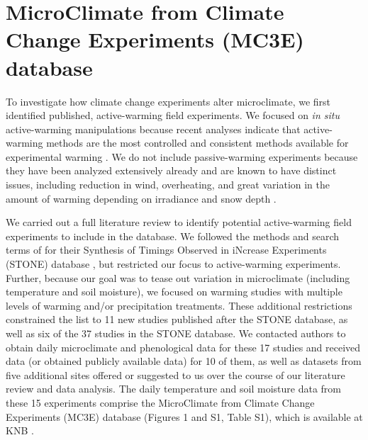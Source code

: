 \documentclass{article}
\begin{document}
\section* {MicroClimate from Climate Change Experiments (MC3E) database}
\par To investigate how climate change experiments alter microclimate, we first identified published, active-warming field experiments. We focused on \textit{in situ} active-warming manipulations because recent analyses indicate that active-warming methods are the most controlled and consistent methods available for experimental warming \citep{kimball2005,kimball2008,aronson2009,wolkovich2012}. We do not include passive-warming experiments because they have been analyzed extensively already and are known to have distinct issues, including reduction in wind, overheating, and great variation in the amount of warming depending on irradiance and snow depth \citep[][see also Table S2]{marion1997,shaver2000,wolkovich2012,bokhorst2013}.
\par We carried out a full literature review to identify potential active-warming field experiments to include in the database. We followed the methods and search terms of \citet{wolkovich2012} for their Synthesis of Timings Observed in iNcrease Experiments (STONE) database \citep{wolkovich2012}, but restricted our focus to active-warming experiments. Further, because our goal was to tease out variation in microclimate (including temperature and soil moisture), we focused on warming studies with multiple levels of warming and/or precipitation treatments. These additional restrictions constrained the list to 11 new studies published after the STONE database, as well as six of the 37 studies in the STONE database. We contacted authors to obtain daily microclimate and phenological data for these 17 studies and received data (or obtained publicly available data) for 10 of them, as well as datasets from five additional sites offered or suggested to us over the course of our literature review and data analysis. The daily temperature and soil moisture data from these 15 experiments comprise the MicroClimate from Climate Change Experiments (MC3E) database (Figures 1 and S1, Table S1), which is available at KNB \citep{ettinger2018}.
\end{document}
